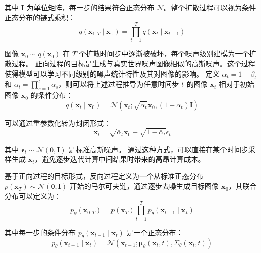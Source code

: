 其中 $\mathbf{I}$ 为单位矩阵，每一步的结果符合正态分布 $\mathcal{N}$。整个扩散过程可以视为条件正态分布的链式乘积：
\begin{equation}
    q\left(\mathbf{x}_{1: T} \mid \mathbf{x}_0\right)=\prod_{t=1}^T q\left(\mathbf{x}_t \mid \mathbf{x}_{t-1}\right)
\end{equation}

图像 $\mathbf{x}_0 \sim q\left(\mathbf{x}_0\right)$ 在 $T$ 个扩散时间步中逐渐被破坏，每个噪声级别建模为一个扩散过程。
正向过程的目标是生成与真实世界噪声图像相似的高斯噪声。这个过程使得模型可以学习不同级别的噪声统计特性及其对图像的影响。
定义 $\alpha_t=1-\beta_t$ 和  $\bar{\alpha}_t = \prod_{s=1}^t \alpha_s$，则可以将上述过程推导为任意时间步 $t$ 的图像 $\mathbf{x}_t$ 相对于初始图像 $\mathbf{x}_0$ 的条件分布：
\begin{equation}
    \label{eq:q}
q\left(\mathbf{x}_t \mid \mathbf{x}_0\right)=\mathcal{N}\left(\mathbf{x}_t ; \sqrt{\bar{\alpha}_t} \mathbf{x}_0,\left(1-\bar{\alpha}_t\right) \mathbf{I}\right)
\end{equation}

可以通过重参数化转为封闭形式：
\begin{equation}
    \label{eq:x0_xt}
    \mathbf{x}_t=\sqrt{\bar{\alpha}_t} \mathbf{x}_0+\sqrt{1-\bar{\alpha}_t} \epsilon_t
\end{equation}

其中 $\boldsymbol{\epsilon}_t \sim \mathcal{N}(\mathbf{0}, \mathbf{I})$ 是标准高斯噪声。
通过这种方式，可以直接在某个时间步采样生成 $\mathbf{x}_t$，避免逐步迭代计算中间结果时带来的高昂计算成本。


基于正向过程的目标形式，反向过程定义为一个从标准正态分布 $p\left(\mathbf{x}_T\right) \sim \mathcal{N}(\mathbf{0}, \mathbf{I})$ 开始的马尔可夫链，通过逐步去噪生成目标图像 $\mathbf{x}_0$，其联合分布可以定义为：
\begin{equation}
\label{eq:p_total}
    p_\theta\left(\mathbf{x}_{0: T}\right) =p\left(\mathbf{x}_T\right) \prod_{t=1}^T p_\theta\left(\mathbf{x}_{t-1} \mid \mathbf{x}_t\right)
\end{equation}

其中每一步的条件分布 $p_\theta(\mathbf{x}_{t-1} \mid \mathbf{x}_t)$ 是一个正态分布：
\begin{equation}
\label{eq:p}
    p_\theta\left(\mathbf{x}_{t-1} \mid \mathbf{x}_t\right) =\mathcal{N}\left(\mathbf{x}_{t-1} ; \boldsymbol{\mu}_\theta\left(\mathbf{x}_t, t\right), \Sigma_\theta\left(\mathbf{x}_t, t\right)\right) 
\end{equation}

